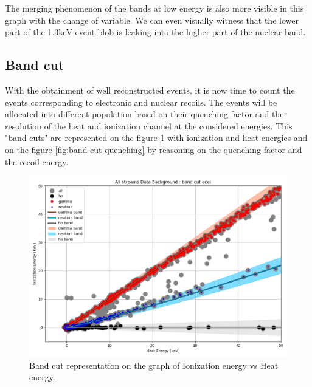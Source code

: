 The merging phenomenon of the bands at low energy is also more visible in this graph with the change of variable. We can even visually witness that the lower part of the 1.3keV event blob is leaking into the higher part of the nuclear band.


\subsection{Band cut}

With the obtainment of well reconstructed events, it is now time to count the events corresponding to electronic and nuclear recoils. The events will be allocated into different population based on their quenching factor and the resolution of the heat and ionization channel at the considered energies. This "band cuts" are represented on the figure \ref{fig:band-cut-ecei} with ionization and heat energies and on the figure \ref{fig:band-cut-quenching} by reasoning on the quenching factor and the recoil energy.

\begin{figure}
\centering
\includegraphics[width=\linewidth,]{Figures/Neutron/band_cut_ecei.png}
\caption{Band cut representation on the graph of Ionization energy vs Heat energy.}
\label{fig:band-cut-ecei}
\end{figure}

